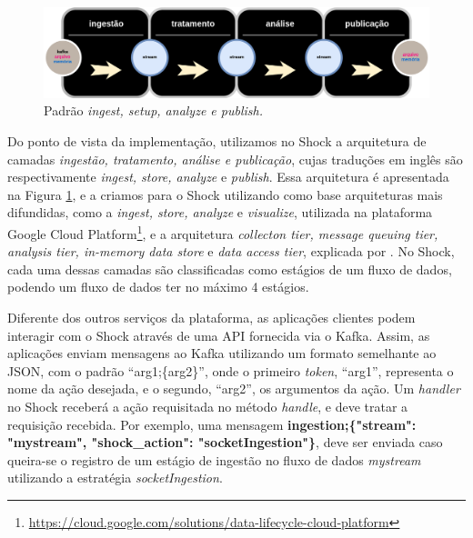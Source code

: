\begin{figure}[hbt]
  \centering
  \includegraphics[scale=0.35]{figuras/arquiteturaforensic.png}
  \caption{Padrão \textit{ingest, setup, analyze e publish.}}
  \label{fig:ingeststore}
\end{figure}

Do ponto de vista da implementação, utilizamos no Shock a arquitetura de camadas
\textit{ingestão, tratamento, análise e publicação}, cujas traduções em inglês são
respectivamente \textit{ingest, store, analyze} e \textit{publish}. Essa arquitetura
é apresentada na Figura \ref{fig:ingeststore}, e a criamos para o Shock utilizando
como base arquiteturas mais difundidas, como a \textit{ingest, store, analyze} e
\textit{visualize}, utilizada na plataforma Google Cloud
Platform\footnote{\url{https://cloud.google.com/solutions/data-lifecycle-cloud-platform}},
e a arquitetura \textit{collecton tier, message queuing tier, analysis tier,
in-memory data store} e \textit{data access tier}, explicada por
. No Shock, cada uma dessas camadas são
classificadas como estágios de um fluxo de dados, podendo um
fluxo de dados ter no máximo 4 estágios.

Diferente dos outros serviços da plataforma, as aplicações clientes podem interagir
com o Shock através de uma API fornecida via o Kafka. Assim, as aplicações enviam
mensagens ao Kafka utilizando um formato semelhante ao JSON, com o padrão ``arg1;\{arg2\}'',
onde o primeiro \textit{token}, ``arg1'', representa o nome
da ação desejada, e o segundo, ``arg2'', os argumentos da ação. Um
\textit{handler} no Shock receberá a ação requisitada no método
\textit{handle}, e deve tratar a requisição recebida. Por exemplo, uma mensagem
\small{\textbf{ingestion;\{"stream": "mystream", "shock\_action": "socketIngestion"\}}},
deve ser enviada caso queira-se o registro de um estágio de ingestão no
fluxo de dados \textit{mystream} utilizando a estratégia \textit{socketIngestion}.

